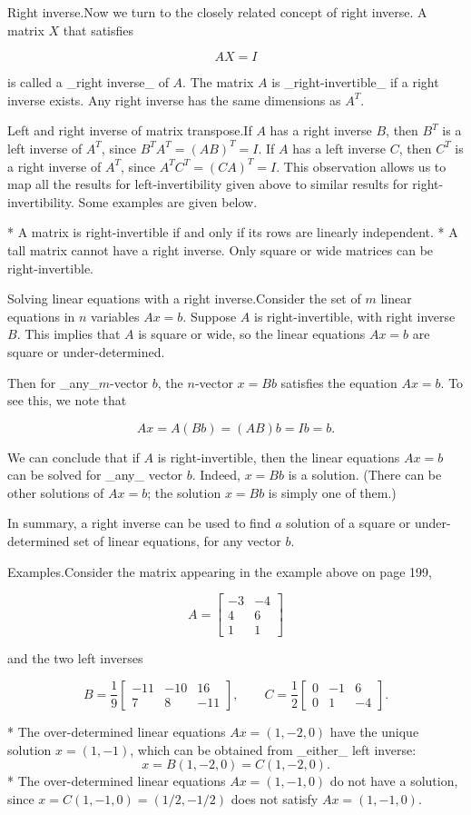 
Right inverse.Now we turn to the closely related concept of right inverse. A matrix \(X\) that satisfies

\[AX=I\]

is called a _right inverse_ of \(A\). The matrix \(A\) is _right-invertible_ if a right inverse exists. Any right inverse has the same dimensions as \(A^{T}\).

Left and right inverse of matrix transpose.If \(A\) has a right inverse \(B\), then \(B^{T}\) is a left inverse of \(A^{T}\), since \(B^{T}A^{T}=(AB)^{T}=I\). If \(A\) has a left inverse \(C\), then \(C^{T}\) is a right inverse of \(A^{T}\), since \(A^{T}C^{T}=(CA)^{T}=I\). This observation allows us to map all the results for left-invertibility given above to similar results for right-invertibility. Some examples are given below.

* A matrix is right-invertible if and only if its rows are linearly independent.
* A tall matrix cannot have a right inverse. Only square or wide matrices can be right-invertible.

Solving linear equations with a right inverse.Consider the set of \(m\) linear equations in \(n\) variables \(Ax=b\). Suppose \(A\) is right-invertible, with right inverse \(B\). This implies that \(A\) is square or wide, so the linear equations \(Ax=b\) are square or under-determined.

Then for _any_\(m\)-vector \(b\), the \(n\)-vector \(x=Bb\) satisfies the equation \(Ax=b\). To see this, we note that

\[Ax=A(Bb)=(AB)b=Ib=b.\]

We can conclude that if \(A\) is right-invertible, then the linear equations \(Ax=b\) can be solved for _any_ vector \(b\). Indeed, \(x=Bb\) is a solution. (There can be other solutions of \(Ax=b\); the solution \(x=Bb\) is simply one of them.)

In summary, a right inverse can be used to find \(a\) solution of a square or under-determined set of linear equations, for any vector \(b\).

Examples.Consider the matrix appearing in the example above on page 199,

\[A=\left[\begin{array}{rr}-3&-4\\ 4&6\\ 1&1\end{array}\right]\]

and the two left inverses

\[B=\frac{1}{9}\left[\begin{array}{rr}-11&-10&16\\ 7&8&-11\end{array}\right],\qquad C=\frac{1}{2}\left[\begin{array}{rr}0&-1&6 \\ 0&1&-4\end{array}\right].\]

* The over-determined linear equations \(Ax=(1,-2,0)\) have the unique solution \(x=(1,-1)\), which can be obtained from _either_ left inverse: \[x=B(1,-2,0)=C(1,-2,0).\]
* The over-determined linear equations \(Ax=(1,-1,0)\) do not have a solution, since \(x=C(1,-1,0)=(1/2,-1/2)\) does not satisfy \(Ax=(1,-1,0)\).

 